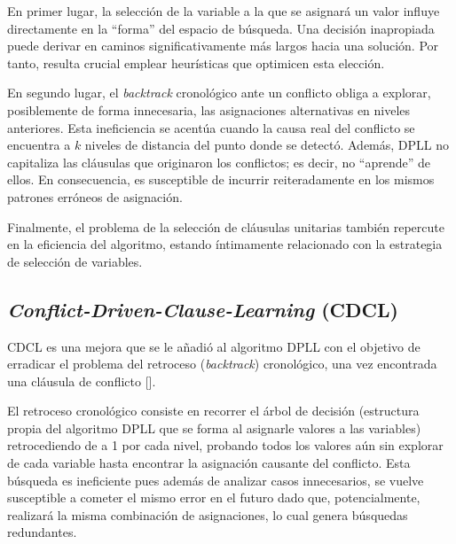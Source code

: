 En primer lugar, la selección de la variable a la que se asignará un valor influye directamente en la ``forma'' del espacio de búsqueda. Una decisión inapropiada puede derivar en caminos significativamente más largos hacia una solución. Por tanto, resulta crucial emplear heurísticas que optimicen esta elección.

En segundo lugar, el \textit{backtrack} cronológico ante un conflicto obliga a explorar, posiblemente de forma innecesaria, las asignaciones alternativas en niveles anteriores. Esta ineficiencia se acentúa cuando la causa real del conflicto se encuentra a $k$ niveles de distancia del punto donde se detectó. Además, DPLL no capitaliza las cláusulas que originaron los conflictos; es decir, no ``aprende'' de ellos. En consecuencia, es susceptible de incurrir reiteradamente en los mismos patrones erróneos de asignación.

Finalmente, el problema de la selección de cláusulas unitarias también repercute en la eficiencia del algoritmo, estando íntimamente relacionado con la estrategia de selección de variables.



\subsection{\textit{Conflict-Driven-Clause-Learning} (CDCL)}
\label{subsection:cdcl}

CDCL es una mejora que se le a\~nadi\'o al algoritmo DPLL con el objetivo de erradicar el problema del retroceso (\textit{backtrack}) cronol\'ogico, una vez encontrada una cl\'ausula de conflicto [\cite{marques-silva2024cdcl}].

El retroceso cronol\'ogico consiste en recorrer el \'arbol de decisi\'on (estructura propia del algoritmo DPLL que se forma al asignarle valores a las variables) retrocediendo de a 1 por cada nivel, probando todos los valores a\'un sin explorar de cada variable hasta encontrar la asignaci\'on causante del conflicto. Esta b\'usqueda es ineficiente pues adem\'as de analizar casos innecesarios, se vuelve susceptible a cometer el mismo error en el futuro dado que, potencialmente, realizar\'a la misma combinaci\'on de asignaciones, lo cual genera b\'usquedas redundantes.

